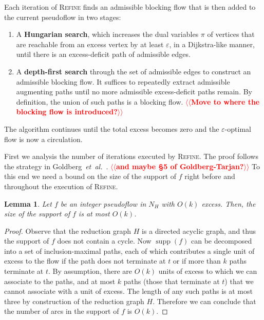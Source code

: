 \documentclass[11pt]{article}
\makeatletter
\def\etal{\textit{et~al.}}
\def\eps{\varepsilon}
\def\supp{\operatorname{supp}}
\theoremstyle{plain}
\newtheorem{lemma}{Lemma}[section]
\numberwithin{figure}{section}
\def\EMPH#1{\textbf{\boldmath #1}}
\def\n@te#1{\textsf{\boldmath \textbf{$\langle\!\langle$#1$\rangle\!\rangle$}}\leavevmode}
\def\note#1{\textcolor{red}{\n@te{#1}}}
\makeatother
\begin{document}
Each iteration of \textsc{Refine} finds an admissible blocking flow that is then added to the current pseudoflow in two stages:
\begin{enumerate}
\item
A \EMPH{Hungarian search}, which increases the dual variables $\pi$ of vertices that are reachable from an excess vertex by at least $\eps$, in a Dijkstra-like manner, until there is an excess-deficit path of admissible edges.
\item
A \EMPH{depth-first search} through the set of admissible edges to construct an admissible blocking flow.
It suffices to repeatedly extract admissible augmenting paths until no more admissible excess-deficit paths remain.
By definition, the union of such paths is a blocking flow. \note{Move to where the blocking flow is introduced?}
\end{enumerate}
The algorithm continues until the total excess becomes zero and the $\eps$-optimal flow is now a circulation.

First we analysis the number of iterations executed by \textsc{Refine}.
The proof follows the strategy in Goldberg~\etal~\cite[Section~3.2]{GHKT17}. \note{and maybe \S5 of Goldberg-Tarjan?}
%
%
To this end we need a bound on the size of the support of $f$ right before and throughout the execution of \textsc{Refine}.

\begin{lemma}
\label{lemma:reduction_count}
Let $f$ be an integer pseudoflow in $N_H$ with $O(k)$ excess.
Then, the size of the support of $f$ is at most $O(k)$.
\end{lemma}

\begin{proof}
Observe that the reduction graph $H$ is a directed acyclic graph, and thus the support of $f$ does not contain a cycle.
Now $\supp(f)$ can be decomposed into a set of inclusion-maximal paths,
each of which contributes a single unit of excess to the flow if the path does not terminate at $t$ or if more than $k$ paths terminate at $t$.
By assumption, there are $O(k)$ units of excess to which we can associate to the paths, and at most $k$ paths (those that terminate at $t$) that we cannot associate with a unit of excess.
The length of any such paths is at most  three by construction of the reduction graph $H$.
Therefore we can conclude that the number of arcs in the support of $f$ is $O(k)$.
\end{proof}
\end{document}
